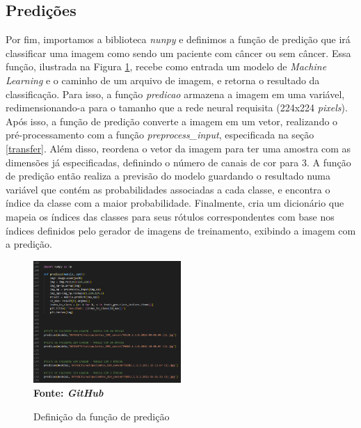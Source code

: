 
\subsection{\esp Predições} \label{pred}

Por fim, importamos a biblioteca \textit{nunpy} e definimos a função de predição que irá classificar uma imagem como sendo um paciente com câncer ou sem câncer. Essa função, ilustrada na Figura \ref{fig:predicao}, recebe como entrada um modelo de \textit{Machine Learning} e o caminho de um arquivo de imagem, e retorna o resultado da classificação. Para isso, a função \textit{predicao} armazena a imagem em uma variável, redimensionando-a para o tamanho que a rede neural requisita (224x224 \textit{pixels}). Após isso, a função de predição converte a imagem em um vetor, realizando o pré-processamento com a função  \textit{preprocess\_input}, especificada na seção \ref{transfer}. Além disso, reordena o vetor da imagem para ter uma amostra com as dimensões já especificadas, definindo o número de canais de cor para 3. A função de predição então realiza a previsão do modelo guardando o resultado numa variável que contém as probabilidades associadas a cada classe, e encontra o índice da classe com a maior probabilidade. Finalmente, cria um dicionário que mapeia os índices das classes para seus rótulos correspondentes com base nos índices definidos pelo gerador de imagens de treinamento, exibindo a imagem com a predição.



\begin{figure}[ht]
 	\centering	
 	\caption[\hspace{0.1cm}Grade Computacional.]{Definição da função de predição}
 	\vspace{-0.4cm}
 	\includegraphics[width=0.5\textwidth]{figuras/predicao.png}
 	\captionsetup{justification=centering}
	\vspace{-0.2cm}
     \\\textbf{\footnotesize Fonte: \textit{GitHub}}
	\label{fig:predicao}
\end{figure}

